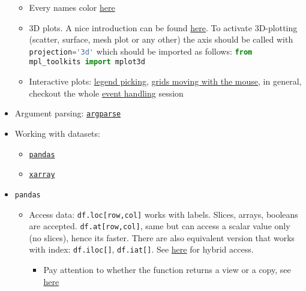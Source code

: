 \documentclass[a4paper,12pt,%
              final%
              ]{article}
\begin{document}
\begin{itemize}
\begin{itemize}
      \item Every names color \href{https://matplotlib.org/stable/gallery/color/named_colors.html}{here}
      \item 3D plots. A nice introduction can be found \href{https://jakevdp.github.io/PythonDataScienceHandbook/04.12-three-dimensional-plotting.html}{here}. To activate 3D-plotting (scatter, surface, mesh plot or any other) the axis should be called with \lstinline[language=python]{projection='3d'} which should be imported as follows: \lstinline[language=python]{from mpl_toolkits import mplot3d}
      \item Interactive plots: \href{https://matplotlib.org/stable/gallery/event_handling/legend_picking.html}{legend picking}, \href{https://matplotlib.org/stable/gallery/event_handling/cursor_demo.html}{grids moving with the mouse}, in general, checkout the whole \href{https://matplotlib.org/stable/gallery/event_handling/index.html}{event handling} session
    \end{itemize}
  \item Argument parsing: \href{https://docs.python.org/3/library/argparse.html#module-argparse}{\texttt{argparse}}
  \item Working with datasets:
    \begin{itemize}
      \item \href{https://pandas.pydata.org/docs/user_guide/10min.html}{\texttt{pandas}}
      \item \href{http://xarray.pydata.org/en/stable/user-guide/index.html}{\texttt{xarray}}
    \end{itemize}
  \item \texttt{pandas}
    \begin{itemize}
      \item Access data: \verb|df.loc[row,col]| works with labels. Slices, arrays, booleans are accepted. \verb|df.at[row,col]|, same but can access a scalar value only (no slices), hence its faster. There are also equivalent version that works with index: \verb|df.iloc[]|, \verb|df.iat[]|. See \href{https://stackoverflow.com/questions/28754603/indexing-pandas-data-frames-integer-rows-named-columns}{here} for hybrid access.
        \begin{itemize}
          \item Pay attention to whether the function returns a view or a copy, see \href{https://pandas.pydata.org/pandas-docs/stable/user_guide/indexing.html#indexing-view-versus-copy}{here}
        \end{itemize}

\end{itemize}
\end{itemize}
\end{document}
